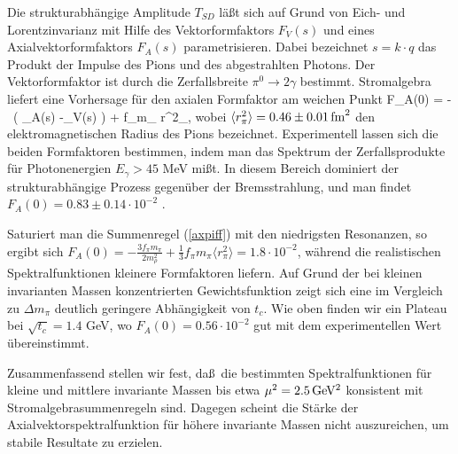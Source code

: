 Die strukturabh\"angige Amplitude $T_{SD}$ l\"a\ss t sich auf Grund von
Eich- und Lorentzinvarianz mit Hilfe des Vektorformfaktors $F_V(s)$
und eines Axialvektorformfaktors $F_A(s)$ parametrisieren. Dabei bezeichnet
$s=k\cdot q$ das Produkt der Impulse des Pions und des abgestrahlten 
Photons. Der Vektorformfaktor ist durch die Zerfallsbreite $\pi^0\to 2\gamma$
bestimmt. Stromalgebra liefert eine Vorhersage f\"ur den axialen 
Formfaktor am weichen Punkt \cite{DMO67}
\be
\label{axpiff}
 F_A(0) = - \int {}\, \left(
  \rho_A(s) -\rho_V(s) \right)  \; +\; f_\pi m_\pi
   \langle r^2_\pi \rangle ,
\ee
wobei $\langle r^2_\pi\rangle=0.46\pm 0.01\,{\rm fm}^2$ \cite{Que78} den 
elektromagnetischen Radius des Pions bezeichnet. Experimentell lassen sich 
die beiden Formfaktoren bestimmen, indem man das Spektrum der 
Zerfallsprodukte f\"ur Photonenergien $E_\gamma>45$ MeV mi\ss t. 
In diesem Bereich dominiert der strukturabh\"angige Prozess
gegen\"uber der Bremsstrahlung, und man findet $F_A(0)=0.83\pm 0.14
\cdot 10^{-2}$ \cite{PDG90}.

Saturiert man die Summenregel (\ref{axpiff}) mit den niedrigsten
Resonanzen, so ergibt sich $F_A(0)=-\frac{3f_\pi m_\pi}{2m_\rho^2}
+\frac{1}{3}f_\pi m_\pi\langle r_\pi^2\rangle =1.8\cdot 10^{-2}$, w\"ahrend 
die realistischen Spektralfunktionen kleinere Formfaktoren liefern. 
Auf Grund der bei kleinen invarianten Massen konzentrierten 
Gewichtsfunktion zeigt sich eine im Vergleich zu $\Delta m_\pi$
deutlich geringere Abh\"angigkeit von $t_c$. Wie oben finden wir ein 
Plateau bei $\sqrt{t_c}=1.4$ GeV, wo $F_A(0)=0.56\cdot 10^{-2}$ 
gut mit dem experimentellen Wert \"ubereinstimmt.  

Zusammenfassend stellen wir fest, da\ss\ die bestimmten Spektralfunktionen
f\"ur kleine und mittlere invariante Massen bis etwa $\mu^2=2.5\,
\rm GeV^2$ konsistent mit Stromalgebrasummenregeln sind. Dagegen scheint
die St\"arke der Axialvektorspektralfunktion f\"ur h\"ohere invariante
Massen nicht auszureichen, um stabile Resultate zu erzielen. 

